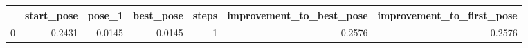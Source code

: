 \begin{tabular}{lrrrrrr}
\toprule
{} &  start\_pose &  pose\_1 &  best\_pose &  steps &  improvement\_to\_best\_pose &  improvement\_to\_first\_pose \\
\midrule
0 &      0.2431 & -0.0145 &    -0.0145 &      1 &                   -0.2576 &                    -0.2576 \\
\bottomrule
\end{tabular}
